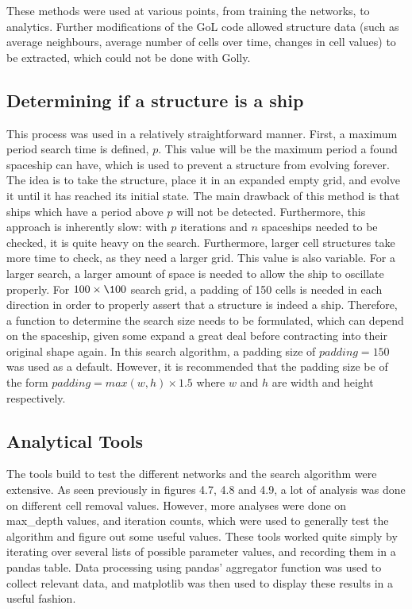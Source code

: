 \documentclass{l4proj}
\begin{document}
These methods were used at various points, from training the networks, to analytics. Further modifications of the GoL code allowed structure data (such as average neighbours, average number of cells over time, changes in cell values) to be extracted, which could not be done with Golly. 

\subsection{Determining if a structure is a ship}

This process was used in a relatively straightforward manner. First, a maximum period search time is defined, $p$. This value will be the maximum period a found spaceship can have, which is used to prevent a structure from evolving forever. The idea is to take the structure, place it in an expanded empty grid, and evolve it until it has reached its initial state. The main drawback of this method is that ships which have a period above $p$ will not be detected. Furthermore, this approach is inherently slow: with $p$ iterations and $n$ spaceships needed to be checked, it is quite heavy on the search. Furthermore, larger cell structures take more time to check, as they need a larger grid. This value is also variable. For a larger search, a larger amount of space is needed to allow the ship to oscillate properly. For $100 \times \100$ search grid, a padding of 150 cells is needed in each direction in order to properly assert that a structure is indeed a ship. Therefore, a function to determine the search size needs to be formulated, which can depend on the spaceship, given some expand a great deal before contracting into their original shape again. In this search algorithm, a padding size of $padding = 150$ was used as a default. However, it is recommended that the padding size be of the form $padding = max(w, h) \times 1.5$ where $w$ and $h$ are width and height respectively.

\subsection{Analytical Tools}

The tools build to test the different networks and the search algorithm were extensive. As seen previously in figures 4.7, 4.8 and 4.9, a lot of analysis was done on different cell removal values. However, more analyses were done on max\_depth values, and iteration counts, which were used to generally test the algorithm and figure out some useful values. These tools worked quite simply by iterating over several lists of possible parameter values, and recording them in a pandas table.  Data processing using pandas' aggregator function was used to collect relevant data, and matplotlib was then used to display these results in a useful fashion. 
\end{document}
